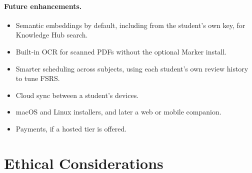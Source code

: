 \paragraph{Future enhancements.}
\begin{itemize}
  \item Semantic embeddings by default, including from the student's own key, for Knowledge Hub search.
  \item Built-in OCR for scanned PDFs without the optional Marker install.
  \item Smarter scheduling across subjects, using each student's own review history to tune FSRS.
  \item Cloud sync between a student's devices.
  \item macOS and Linux installers, and later a web or mobile companion.
  \item Payments, if a hosted tier is offered.
\end{itemize}

\section{Ethical Considerations}

